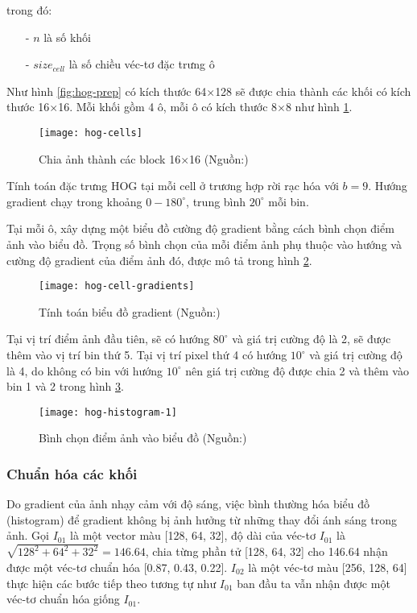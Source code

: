 trong đó:

\begin{itemize}
	\item[-] $n$ là số khối
	\item[-] $size_{cell}$ là số chiều véc-tơ đặc trưng ô
\end{itemize}

Như hình \ref{fig:hog-prep} có kích thước 64$\times$128 sẽ được chia thành các khối có kích thước 16$\times$16. Mỗi khối gồm 4 ô, mỗi ô có kích thước 8$\times$8 như hình \ref{fig:hog-cells}.
\begin{figure}[h]
	\centering
	\texttt{[image: hog-cells]}
	\caption[Chia ảnh thành các block 16$\times$16]{Chia ảnh thành các block 16$\times$16 (Nguồn:\cite{learnopencv})}
	\label{fig:hog-cells}
\end{figure}
Tính toán đặc trưng HOG tại mỗi cell ở trương hợp rời rạc hóa với $b=9$. Hướng gradient chạy trong khoảng $0 - 180^{\circ}$, trung bình $20^{\circ}$ mỗi bin.\par

Tại mỗi ô, xây dựng một biểu đồ cường độ gradient bằng cách bình chọn điểm ảnh vào biểu đồ. Trọng số bình chọn của mỗi điểm ảnh phụ thuộc vào hướng và cường độ gradient của điểm ảnh đó, được mô tả trong hình \ref{fig:hog-cell-gradients}.
\begin{figure}[h]
	\centering
	\texttt{[image: hog-cell-gradients]}
	\caption[Tính toán biểu đồ gradient]{Tính toán biểu đồ gradient (Nguồn:\cite{learnopencv})}
	\label{fig:hog-cell-gradients}
\end{figure}

Tại vị trí điểm ảnh đầu tiên, sẽ có hướng $80^{\circ}$ và giá trị cường độ là 2, sẽ được thêm vào vị trí bin thứ 5. Tại vị trí pixel thứ 4 có hướng $10^{\circ}$ và giá trị cường độ là 4, do không có bin với hướng $10^{\circ}$ nên giá trị cường độ được chia 2 và thêm vào bin 1 và 2 trong hình \ref{fig:hog-histogram-1}.
\begin{figure}[h]
	\centering
	\texttt{[image: hog-histogram-1]}
	\caption[Bình chọn điểm ảnh vào biểu đồ]{Bình chọn điểm ảnh vào biểu đồ (Nguồn:\cite{learnopencv})}
	\label{fig:hog-histogram-1}
\end{figure}

\subsubsection{Chuẩn hóa các khối}
Do gradient của ảnh nhạy cảm với độ sáng, việc bình thường hóa biểu đồ (histogram) để gradient không bị ảnh hưởng từ những thay đổi ánh sáng trong ảnh. Gọi $I_{01}$ là một vector màu [128, 64, 32], độ dài của véc-tơ $I_{01}$ là $\sqrt{128^2 + 64^2 + 32^2} = 146. 64$, chia từng phần tử [128, 64, 32] cho 146.64 nhận được một véc-tơ chuẩn hóa [0.87, 0.43, 0.22]. $I_{02}$ là một véc-tơ màu [256, 128, 64] thực hiện các bước tiếp theo tương tự như $I_{01}$ ban đầu ta vẫn nhận được một véc-tơ chuẩn hóa giống $I_{01}$.\par

